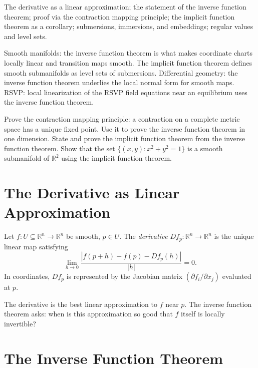 \documentclass[12pt, twoside, openright, a4paper]{book}
\newcommand{\R}{\mathbb{R}}
\begin{document}
\begin{structures}
The derivative as a linear approximation; the statement of the inverse function theorem; proof via the contraction mapping principle; the implicit function theorem as a corollary; submersions, immersions, and embeddings; regular values and level sets.
\end{structures}

\begin{dependencies}
Smooth manifolds: the inverse function theorem is what makes coordinate charts locally linear and transition maps smooth.
The implicit function theorem defines smooth submanifolds as level sets of submersions.
Differential geometry: the inverse function theorem underlies the local normal form for smooth maps.
RSVP: local linearization of the RSVP field equations near an equilibrium uses the inverse function theorem.
\end{dependencies}

\begin{exercises_box}
Prove the contraction mapping principle: a contraction on a complete metric space has a unique fixed point.
Use it to prove the inverse function theorem in one dimension.
State and prove the implicit function theorem from the inverse function theorem.
Show that the set $\{(x,y) : x^2 + y^2 = 1\}$ is a smooth submanifold of $\R^2$ using the implicit function theorem.
\end{exercises_box}

\section{The Derivative as Linear Approximation}

Let $f: U \subseteq \R^n \to \R^n$ be smooth, $p \in U$.
The \emph{derivative} $Df_p: \R^n \to \R^n$ is the unique linear map satisfying
\[\lim_{h \to 0} \frac{|f(p+h) - f(p) - Df_p(h)|}{|h|} = 0.\]
In coordinates, $Df_p$ is represented by the Jacobian matrix $(\partial f_i / \partial x_j)$ evaluated at $p$.

The derivative is the best linear approximation to $f$ near $p$.
The inverse function theorem asks: when is this approximation so good that $f$ itself is locally invertible?

\section{The Inverse Function Theorem}
\end{document}
